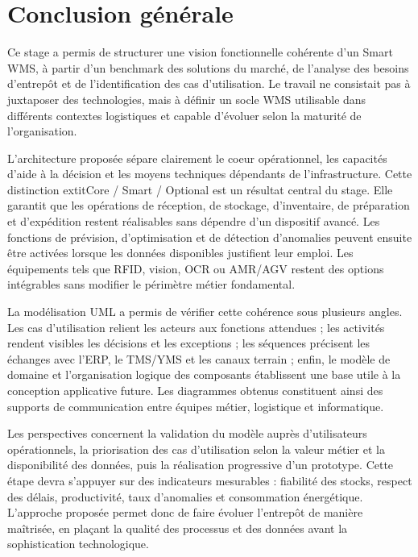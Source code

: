\chapter*{Conclusion générale}

Ce stage a permis de structurer une vision fonctionnelle cohérente d'un Smart WMS, à partir d'un benchmark des solutions du marché, de l'analyse des besoins d'entrepôt et de l'identification des cas d'utilisation. Le travail ne consistait pas à juxtaposer des technologies, mais à définir un socle WMS utilisable dans différents contextes logistiques et capable d'évoluer selon la maturité de l'organisation.

L'architecture proposée sépare clairement le coeur opérationnel, les capacités d'aide à la décision et les moyens techniques dépendants de l'infrastructure. Cette distinction 	extit{Core / Smart / Optional} est un résultat central du stage. Elle garantit que les opérations de réception, de stockage, d'inventaire, de préparation et d'expédition restent réalisables sans dépendre d'un dispositif avancé. Les fonctions de prévision, d'optimisation et de détection d'anomalies peuvent ensuite être activées lorsque les données disponibles justifient leur emploi. Les équipements tels que RFID, vision, OCR ou AMR/AGV restent des options intégrables sans modifier le périmètre métier fondamental.

La modélisation UML a permis de vérifier cette cohérence sous plusieurs angles. Les cas d'utilisation relient les acteurs aux fonctions attendues ; les activités rendent visibles les décisions et les exceptions ; les séquences précisent les échanges avec l'ERP, le TMS/YMS et les canaux terrain ; enfin, le modèle de domaine et l'organisation logique des composants établissent une base utile à la conception applicative future. Les diagrammes obtenus constituent ainsi des supports de communication entre équipes métier, logistique et informatique.

Les perspectives concernent la validation du modèle auprès d'utilisateurs opérationnels, la priorisation des cas d'utilisation selon la valeur métier et la disponibilité des données, puis la réalisation progressive d'un prototype. Cette étape devra s'appuyer sur des indicateurs mesurables : fiabilité des stocks, respect des délais, productivité, taux d'anomalies et consommation énergétique. L'approche proposée permet donc de faire évoluer l'entrepôt de manière maîtrisée, en plaçant la qualité des processus et des données avant la sophistication technologique.
